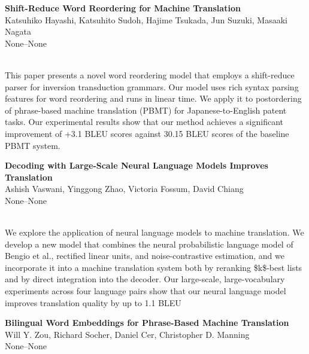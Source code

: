 \documentclass[twoside,makeidx]{book}
\begin{document}
\par\vspace{2em}\noindent%
\begin{minipage}{\linewidth}%
\begin{center}
\textbf{\normalsize Shift-Reduce Word Reordering for Machine Translation}\\
\normalsize  Katsuhiko Hayashi,  Katsuhito Sudoh,  Hajime Tsukada,  Jun Suzuki,  Masaaki Nagata\\
{\small None--None}\\
\end{center}
\end{minipage}\\[0.5em]
\nopagebreak%
\noindent%
{\small This paper presents a novel word reordering model that employs a shift-reduce parser for inversion transduction grammars. Our model uses rich syntax parsing features for word reordering and runs in linear time. We apply it to postordering of phrase-based machine translation (PBMT) for Japanese-to-English patent tasks. Our experimental results show that our method achieves a significant improvement of +3.1 BLEU scores against 30.15 BLEU scores of the baseline PBMT system.}
\par\vspace{2em}\noindent%
\begin{minipage}{\linewidth}%
\begin{center}
\textbf{\normalsize Decoding with Large-Scale Neural Language Models Improves Translation}\\
\normalsize  Ashish Vaswani,  Yinggong Zhao,  Victoria Fossum,  David Chiang\\
{\small None--None}\\
\end{center}
\end{minipage}\\[0.5em]
\nopagebreak%
\noindent%
{\small We explore the application of neural language models to machine translation. We develop a new model that combines the neural probabilistic language model of Bengio et al., rectified linear units, and noise-contrastive estimation, and we incorporate it into a machine translation system both by reranking \$k\$-best lists and by direct integration into the decoder. Our large-scale, large-vocabulary experiments across four language pairs show that our neural language model improves translation quality by up to 1.1 BLEU}
\par\vspace{2em}\noindent%
\begin{minipage}{\linewidth}%
\begin{center}
\textbf{\normalsize Bilingual Word Embeddings for Phrase-Based Machine Translation}\\
\normalsize  Will Y. Zou,  Richard Socher,  Daniel Cer,  Christopher D. Manning\\
{\small None--None}\\
\end{center}
\end{minipage}\\[0.5em]
\end{document}
